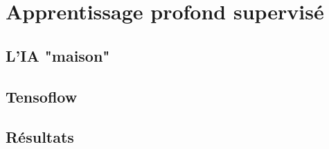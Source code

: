 \section{Apprentissage profond supervisé}

\subsection{L'IA "maison"}
	
	\begin{frame}
		
	\end{frame}

\subsection{Tensoflow}
	
	\begin{frame}
		
	\end{frame}

\subsection{Résultats}
	
	\begin{frame}
		
	\end{frame}